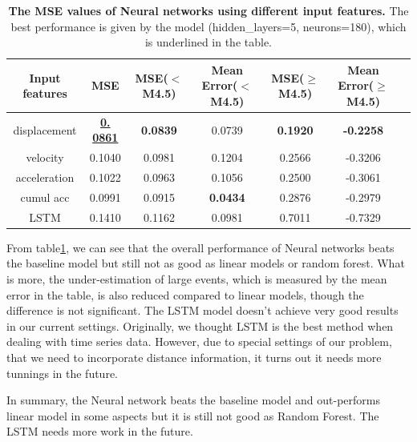 \documentclass{article} %
\begin{document}
\begin{table}[htbp]
	\small
	\centering
	\begin{tabular}{@{}|c|c|c|c|c|c|c|@{}} %
		\hline
		\cline{2-6}
		Input features & MSE & MSE($<$M4.5) & Mean Error($<$M4.5)& MSE($\geq$M4.5) & Mean Error($\geq$M4.5)\\ 
		\cline{2-6} \hline \hline
		displacement & \textbf{\underline{0. 0861}} & \textbf{0.0839} & 0.0739 & \textbf{0.1920}  & \textbf{-0.2258} \\
		 velocity & 0.1040  &  0.0981 & 0.1204 & 0.2566 & -0.3206\\ 
		acceleration &  0.1022 & 0.0963 & 0.1056 & 0.2500 & -0.3061 \\ 
		 cumul acc & 0.0991 & 0.0915 & \textbf{0.0434} & 0.2876  & -0.2979 \\ 
		 LSTM & 0.1410 & 0.1162 & 0.0981 & 0.7011 & -0.7329 \\
		 \hline
	\end{tabular}
	\caption{{\bf The MSE values of Neural networks using different input features.} The best performance is given by the model (hidden\_layers=5, neurons=180), which is underlined in the table.}
	\label{tab:nn_perf}
\end{table}

From table\ref{tab:nn_perf}, we can see that the overall performance of Neural networks beats the baseline model but still not as good as linear models or random forest. What is more, the under-estimation of large events, which is measured by the mean error in the table, is also reduced compared to linear models, though the difference is not significant. The LSTM model doesn't achieve very good results in our current settings. Originally, we thought LSTM is the best method when dealing with time series data. However, due to special settings of our problem, that we need to incorporate distance information, it turns out it needs more tunnings in the future.

In summary, the Neural network beats the baseline model and out-performs linear model in some aspects but it is still not good as Random Forest.  The LSTM needs more work in the future.
\end{document}
